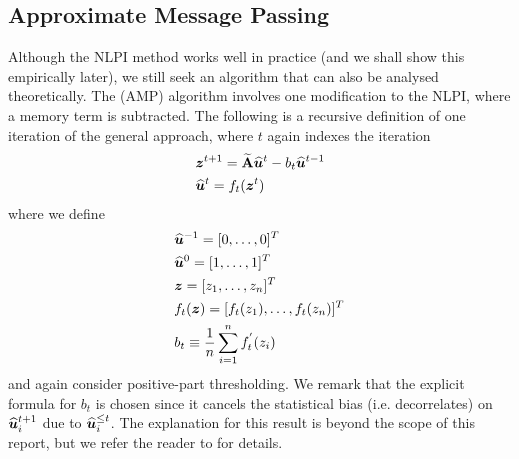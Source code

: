 
\subsection{Approximate Message Passing}
\label{subsec:approximateMessagePassing}

Although the NLPI method works well in practice (and we shall show this empirically later), we still seek an algorithm that can also be analysed theoretically. The  (AMP) algorithm involves one modification to the NLPI, where a memory term is subtracted.
The following is a recursive definition of one iteration of the general approach, where $t$ again indexes the iteration
\begin{equation}
	\label{eq:AMPAlgorithm}
	\begin{split}
		&\vecvar{z}^{t+1} = \widetilde{\matvar{A}} \widehat{\vecvar{u}}^{t} - b_{t}\widehat{\vecvar{u}}^{t-1}\\
		&\widehat{\vecvar{u}}^{t} = f_{t}(\vecvar{z}^{t})
	\end{split}
\end{equation}
where we define
\begin{equation}
	\label{eq:AMPAlgorithmConditions}
	\begin{split}
		&\widehat{\vecvar{u}}^{-1} = \transpose{[0,\dots,0]} \\
		&\widehat{\vecvar{u}}^{0} = \transpose{[1,\dots,1]} \\
		&\vecvar{z} = \transpose{[z_{1},\dots,z_{n}]} \\
		&f_{t}(\vecvar{z}) = \transpose{[f_{t}(z_{1}),\dots,f_{t}(z_{n})]} \\
		&b_{t} \equiv \frac{1}{n}\sum_{i=1}^{n}f_{t}^{'}(z_{i})
	\end{split}
\end{equation}
and again consider positive-part thresholding.
We remark that the explicit formula for $b_{t}$ is chosen since it cancels the statistical bias (i.e. decorrelates) on $\widehat{\vecvar{u}}^{t+1}_{i}$ due to $\widehat{\vecvar{u}}^{\leq t}_{i}$.
The explanation for this result is beyond the scope of this report, but we refer the reader to \cite{DMM09,MDM10,BM11,Mon11,BKS13} for details.
